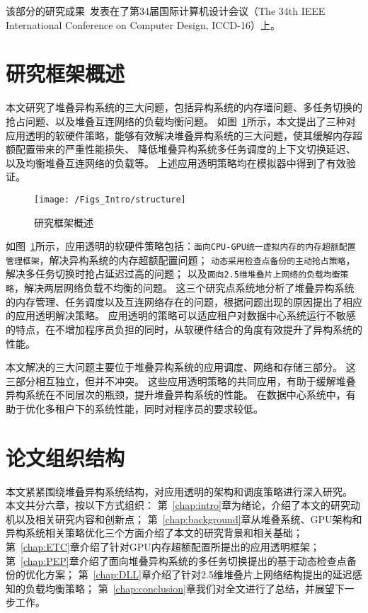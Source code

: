 该部分的研究成果~发表在了第34届国际计算机设计会议（The 34th IEEE International Conference on Computer Design, ICCD-16）上。

\section{研究框架概述}

本文研究了堆叠异构系统的三大问题，包括异构系统的内存墙问题、多任务切换的抢占问题、以及堆叠互连网络的负载均衡问题。
如图~\ref{fig:structure}所示，本文提出了三种对应用透明的软硬件策略，能够有效解决堆叠异构系统的三大问题，使其缓解内存超额配置带来的严重性能损失、
降低堆叠异构系统多任务调度的上下文切换延迟、以及均衡堆叠互连网络的负载等。
上述应用透明策略均在模拟器中得到了有效验证。

\begin{figure}[htbp] %
  \centering
  \texttt{[image: /Figs\_Intro/structure]}
  \caption{研究框架概述}
  \label{fig:structure}
\end{figure}

如图~\ref{fig:structure}所示，应用透明的软硬件策略包括：\texttt{面向CPU-GPU统一虚拟内存的内存超额配置管理框架}，解决异构系统的内存超额配置问题；
\texttt{动态采用检查点备份的主动抢占策略}，解决多任务切换时抢占延迟过高的问题；
以及\texttt{面向2.5维堆叠片上网络的负载均衡策略}，解决两层网络负载不均衡的问题。
这三个研究点系统地分析了堆叠异构系统的内存管理、任务调度以及互连网络存在的问题，根据问题出现的原因提出了相应的应用透明解决策略。
应用透明的策略可以适应租户对数据中心系统运行不敏感的特点，在不增加程序员负担的同时，从软硬件结合的角度有效提升了异构系统的性能。


本文解决的三大问题主要位于堆叠异构系统的应用调度、网络和存储三部分。
这三部分相互独立，但并不冲突。
这些应用透明策略的共同应用，有助于缓解堆叠异构系统在不同层次的瓶颈，提升堆叠异构系统的性能。
在数据中心系统中，有助于优化多租户下的系统性能，同时对程序员的要求较低。




\section{论文组织结构}
本文紧紧围绕堆叠异构系统结构，对应用透明的架构和调度策略进行深入研究。
本文共分六章，按以下方式组织：
第~\ref{chap:intro}章为绪论，介绍了本文的研究动机以及相关研究内容和创新点；
第~\ref{chap:background}章从堆叠系统、GPU架构和异构系统相关策略优化三个方面介绍了本文的研究背景和相关基础；
第~\ref{chap:ETC}章介绍了针对GPU内存超额配置所提出的应用透明框架；
第~\ref{chap:PEP}章介绍了面向堆叠异构系统的多任务切换提出的基于动态检查点备份的优化方案；
第~\ref{chap:DLL}章介绍了针对2.5维堆叠片上网络结构提出的延迟感知的负载均衡策略；
第~\ref{chap:conclusion}章我们对全文进行了总结，并展望下一步工作。
